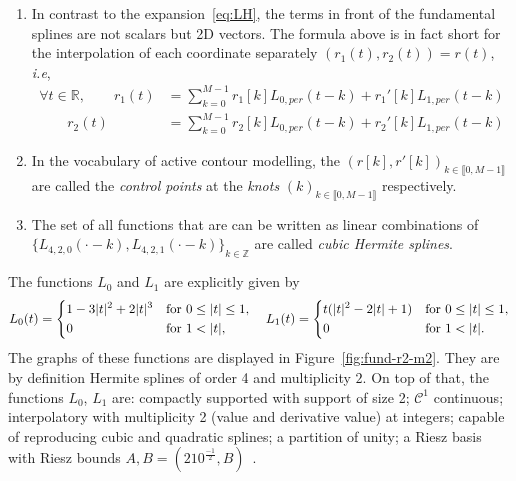 \begin{remark}
  \begin{enumerate}
    \item In contrast to the expansion~\ref{eq:LH}, the terms in front of the fundamental splines are not scalars but 2D 
      vectors. The formula above is in fact short for the interpolation of each coordinate separately $(r_1(t), r_2(t)) 
      = r(t)$, \textit{i.e},
      \begin{align*}
	\forall t \in \mathbb{R}, \qquad r_1(t) &= \sum_{k=0}^{M-1} r_1[k] L_{0, per}(t-k) + r_1'[k] L_{1,per}(t-k) \\
	\qquad r_2(t) &= \sum_{k=0}^{M-1} r_2[k] L_{0,per}(t-k) + r_2'[k] L_{1,per}(t-k)
      \end{align*}
    \item In the vocabulary of active contour modelling, the $(r[k],r'[k])_{k \in \llbracket0,M-1\rrbracket}$ are called 
      the \emph{control points} at the \emph{knots} $(k)_{k \in \llbracket0,M-1\rrbracket}$ respectively.
    \item The set of all functions that are can be written as linear combinations of ${\{L_{4,2,0}(\cdot-k), 
      L_{4,2,1}(\cdot-k)\}}_{k \in \mathbb{Z}}$ are called \emph{cubic Hermite splines}.
  \end{enumerate}
\end{remark}

The functions $L_0$ and $L_1$ are explicitly given by
\begin{equation}
    L_0(t) = \begin{dcases}
      1-3|t|^2 + 2|t|^3 &\text{for } 0 \leq |t| \leq 1,\\
      0 &\text{for } 1 < |t|,\\
    \end{dcases} \quad
    \hfill
    L_1(t) = \begin{dcases}
      t(|t|^2-2|t|+1) &\text{for } 0 \leq |t| \leq 1,\\
      0 &\text{for } 1 < |t|.\\
    \end{dcases}
\end{equation}
The graphs of these functions are displayed in Figure~\ref{fig:fund-r2-m2}. They are by definition Hermite splines of 
order 4 and multiplicity $2$. On top of that, the functions $L_0$, $L_1$ are: compactly supported with support of size 
2; $\mathcal{C}^1$ continuous; interpolatory with multiplicity 2 (value and derivative value) at integers; capable of 
reproducing cubic and quadratic splines; a partition of unity; a Riesz basis with Riesz bounds $A, B = 
(210^{\frac{-1}{2}}, B)$~\cite{uhlmann_hermite_2016}.

